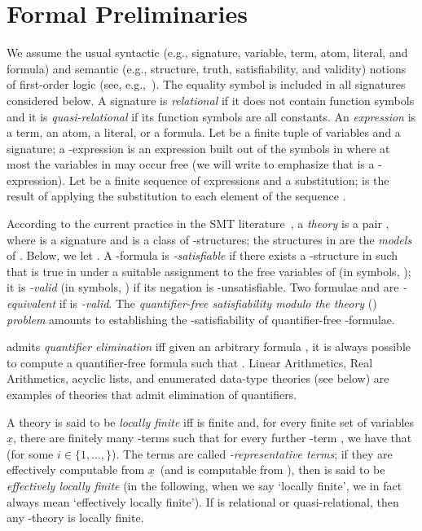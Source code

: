 \documentclass{LMCS}
\newcommand{\idx}[2][i]{\ensuremath {#1 \in \{1,\ldots,\mbox{}\}}}
\newcommand{\ux}{\ensuremath{\underline x}}
\theoremstyle{plain}\newtheorem{assumption}[thm]{Assumption}
\theoremstyle{plain}\newtheorem{proposition}[thm]{Proposition}
\theoremstyle{plain}\newtheorem{property}[thm]{Property}
\theoremstyle{plain}\newtheorem{example}[thm]{Example}
\theoremstyle{plain}\newtheorem{claim}[thm]{Claim}
\theoremstyle{plain}\newtheorem{lemma}[thm]{Lemma}
\begin{document}
\section{Formal Preliminaries}
\label{sec:prelim}

We assume the usual syntactic (e.g., signature, variable, term, atom,
literal, and formula) and semantic (e.g., structure, truth, satisfiability, and validity) notions of first-order logic
(see, e.g.,~\cite{enderton}).  The equality symbol  is included in
all signatures considered below.  A signature is \emph{relational} if
it does not contain function symbols and it is \emph{quasi-relational}
if its function symbols are all constants.  An \emph{expression} is a term, an atom, a literal, or a
formula. Let  be a finite tuple of variables and  a
signature; a -expression is an expression built out of
the symbols in  where at most the variables in  may occur
free (we will write  to emphasize that  is a
-expression).  Let  be a finite sequence
of expressions and  a substitution;  is
the result of applying the substitution  to each element of
the sequence .


According to the current practice in the SMT
literature~\cite{smt-lib}, a \emph{theory}  is a pair , where  is a signature and  is a class of
-structures; the structures in  are the \emph{models} of
.  Below, we let .
A -formula  is \emph{-satisfiable} if there exists a
-structure  in  such that  is true in 
under a suitable assignment to the free variables of  (in
symbols, ); it is \emph{-valid} (in symbols,
) if its negation is -unsatisfiable.  Two
formulae  and  are \emph{-equivalent} if
 is \emph{-valid}.  The
\emph{quantifier-free satisfiability modulo the theory } ()
\emph{problem} amounts to establishing the -satisfiability of
quantifier-free -formulae.

 admits \emph{quantifier elimination} iff
given an arbitrary formula , it is always possible to
compute a quantifier-free formula  such that .  Linear
Arithmetics, Real Arithmetics, acyclic lists, and enumerated data-type
theories (see below) are examples of theories that admit elimination
of quantifiers.

A theory  is said to be \emph{locally finite} iff
 is finite and, for every finite set of variables \ux, there
are finitely many -terms  such
that for every further -term , we have that  (for some \idx{k_{\ux}}). The terms  are called \emph{-representative terms}; if
they are effectively computable from \ux\ (and  is computable
from ), then  is said to be \emph{effectively locally finite}
(in the following, when we say `locally finite', we in fact always
mean `effectively locally finite').  If  is relational or
quasi-relational, then any -theory  is locally finite.
\end{document}
